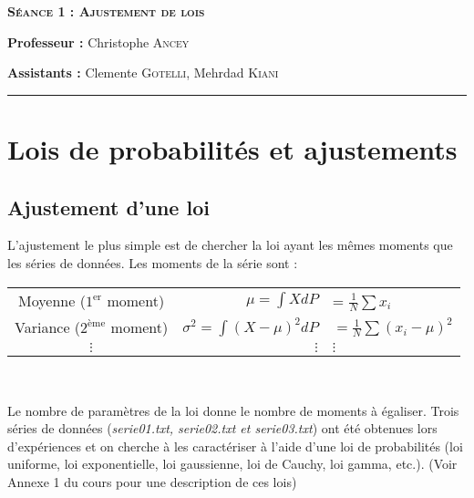 \documentclass[a4paper,12pt]{article}
\begin{document}
\pagestyle{fancy}
\fancyhead{}



\huge
\textsc{\textbf{Séance 1 : Ajustement de lois}}

\small
 \vspace{10pt}
     \textbf{Professeur :} Christophe \textsc{Ancey} 

    \vspace{10pt}
  \textbf{Assistants :} Clemente \textsc{Gotelli, }Mehrdad \textsc{Kiani}\\ 
    \vspace{10pt}
\hrule
\small
%
 

\section{Lois de probabilités et ajustements}
\subsection {Ajustement d'une loi}

L'ajustement le plus simple est de chercher la loi ayant les mêmes moments que
les séries de données. Les moments de la série sont :\\
\vskip0.5cm
\begin{center}
\begin{tabular}{c rl}
Moyenne ($1^{\mathrm{er}}$ moment) & $\mu=\int X dP$ &= $\displaystyle\frac 1N \sum x_i$ \\ 
Variance ($2^{\mathrm{ème}}$ moment) & $\sigma^{2}=\int (X-\mu)^{2} dP$ & $=\displaystyle \frac 1N \sum (x_i-\mu)^{2}$ \\  
{\centering $\vdots$} & $\vdots$ & $\vdots$
\end{tabular}\\
\vskip0.5cm
\end{center}
Le nombre de paramètres de la loi donne le nombre de moments à égaliser. Trois
séries de données (\textit{serie01.txt, serie02.txt et serie03.txt}) ont été
obtenues lors d'expériences et on cherche à les caractériser à l'aide d'une loi de
probabilités (loi uniforme, loi exponentielle, loi gaussienne, loi de Cauchy, loi gamma, etc.).
(Voir Annexe 1 du cours pour une description de ces lois) \\
\end{document}

